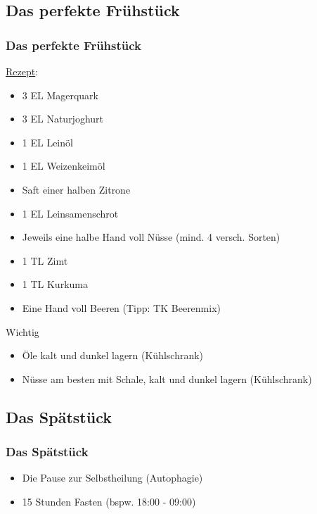 \documentclass[xcolor=dvipsnames]{beamer}
\begin{document}
    \subsection{Das perfekte Frühstück}
    \begin{frame}[allowframebreaks]
        \frametitle{Das perfekte Frühstück}
        \underline{Rezept}:
        \begin{itemize}
            \setlength\itemsep{0.6em}
            \item 3 EL Magerquark
            \item 3 EL Naturjoghurt
            \item 1 EL Leinöl
            \item 1 EL Weizenkeimöl
            \item Saft einer halben Zitrone
            \item 1 EL Leinsamenschrot
            \item Jeweils eine halbe Hand voll Nüsse (mind. 4 versch. Sorten)
            \item 1 TL Zimt
            \item 1 TL Kurkuma
            \item Eine Hand voll Beeren (Tipp: TK Beerenmix)
        \end{itemize}

        \framebreak

        \begin{block}{Wichtig}
            \begin{itemize}
                \setlength\itemsep{1em}
                \item Öle kalt und dunkel lagern (Kühlschrank)
                \item Nüsse am besten mit Schale, kalt und dunkel lagern (Kühlschrank)
            \end{itemize}
        \end{block}

    \end{frame}

    \subsection{Das Spätstück}
    \begin{frame}
        \frametitle{Das Spätstück}
        \begin{itemize}
            \setlength\itemsep{1em}
            \item Die Pause zur Selbstheilung (Autophagie)
            \item 15 Stunden Fasten (bspw. 18:00 - 09:00)
        \end{itemize}
    \end{frame}
\end{document}
